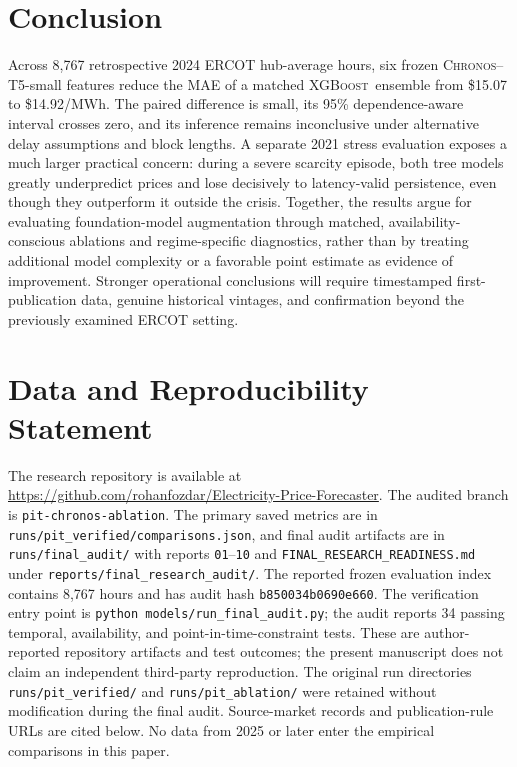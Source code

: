 \documentclass[11pt,letterpaper]{article}
\newcommand{\MWh}{\ensuremath{\mathrm{MWh}}}
\newcommand{\Chronos}{\textsc{Chronos}}
\newcommand{\XGB}{\textsc{XGBoost}}
\begin{document}
\section{Conclusion}\label{sec:conclusion}
Across 8,767 retrospective 2024 ERCOT hub-average hours, six frozen \Chronos--T5-small features reduce the MAE of a matched \XGB\ ensemble from \$15.07 to \$14.92/\MWh. The paired difference is small, its 95\% dependence-aware interval crosses zero, and its inference remains inconclusive under alternative delay assumptions and block lengths. A separate 2021 stress evaluation exposes a much larger practical concern: during a severe scarcity episode, both tree models greatly underpredict prices and lose decisively to latency-valid persistence, even though they outperform it outside the crisis. Together, the results argue for evaluating foundation-model augmentation through matched, availability-conscious ablations and regime-specific diagnostics, rather than by treating additional model complexity or a favorable point estimate as evidence of improvement. Stronger operational conclusions will require timestamped first-publication data, genuine historical vintages, and confirmation beyond the previously examined ERCOT setting.

\section*{Data and Reproducibility Statement}
The research repository is available at \url{https://github.com/rohanfozdar/Electricity-Price-Forecaster}. The audited branch is \texttt{pit-chronos-ablation}. The primary saved metrics are in \texttt{runs/pit\_verified/comparisons.json}, and final audit artifacts are in \texttt{runs/final\_audit/} with reports \texttt{01}--\texttt{10} and \texttt{FINAL\_RESEARCH\_READINESS.md} under \texttt{reports/final\_research\_audit/}. The reported frozen evaluation index contains 8,767 hours and has audit hash \texttt{b850034b0690e660}. The verification entry point is \texttt{python models/run\_final\_audit.py}; the audit reports 34 passing temporal, availability, and point-in-time-constraint tests. These are author-reported repository artifacts and test outcomes; the present manuscript does not claim an independent third-party reproduction. The original run directories \texttt{runs/pit\_verified/} and \texttt{runs/pit\_ablation/} were retained without modification during the final audit. Source-market records and publication-rule URLs are cited below. No data from 2025 or later enter the empirical comparisons in this paper.
\end{document}
